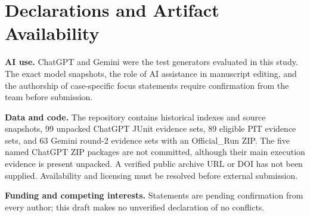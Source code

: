 \section*{Declarations and Artifact Availability}
\textbf{AI use.} ChatGPT and Gemini were the test generators evaluated in this study. The exact model snapshots, the role of AI assistance in manuscript editing, and the authorship of case-specific focus statements require confirmation from the team before submission.

\textbf{Data and code.} The repository contains historical indexes and source snapshots, 99 unpacked ChatGPT JUnit evidence sets, 89 eligible PIT evidence sets, and 63 Gemini round-2 evidence sets with an Official\_Run ZIP. The five named ChatGPT ZIP packages are not committed, although their main execution evidence is present unpacked. A verified public archive URL or DOI has not been supplied. Availability and licensing must be resolved before external submission.

\textbf{Funding and competing interests.} Statements are pending confirmation from every author; this draft makes no unverified declaration of no conflicts.
